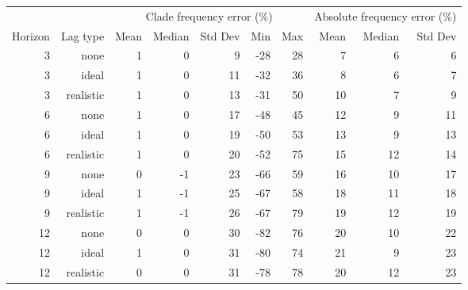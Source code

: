 
\begin{tabular*}{1.0\textwidth}{rrrrrrrrrr}
\toprule
        &            & \multicolumn{5}{c}{Clade frequency error (\%)} & \multicolumn{3}{c}{Absolute frequency error (\%)} \\
Horizon & Lag type & Mean & Median & Std Dev & Min & Max & Mean & Median & Std Dev \\
\midrule

3 & none & 1 & 0 & 9 & -28 & 28 & 7 & 6 & 6 \\
3 & ideal & 1 & 0 & 11 & -32 & 36 & 8 & 6 & 7 \\
3 & realistic & 1 & 0 & 13 & -31 & 50 & 10 & 7 & 9 \\
6 & none & 1 & 0 & 17 & -48 & 45 & 12 & 9 & 11 \\
6 & ideal & 1 & 0 & 19 & -50 & 53 & 13 & 9 & 13 \\
6 & realistic & 1 & 0 & 20 & -52 & 75 & 15 & 12 & 14 \\
9 & none & 0 & -1 & 23 & -66 & 59 & 16 & 10 & 17 \\
9 & ideal & 1 & -1 & 25 & -67 & 58 & 18 & 11 & 18 \\
9 & realistic & 1 & -1 & 26 & -67 & 79 & 19 & 12 & 19 \\
12 & none & 0 & 0 & 30 & -82 & 76 & 20 & 10 & 22 \\
12 & ideal & 1 & 0 & 31 & -80 & 74 & 21 & 9 & 23 \\
12 & realistic & 0 & 0 & 31 & -78 & 78 & 20 & 12 & 23 \\

\bottomrule
\end{tabular*}

